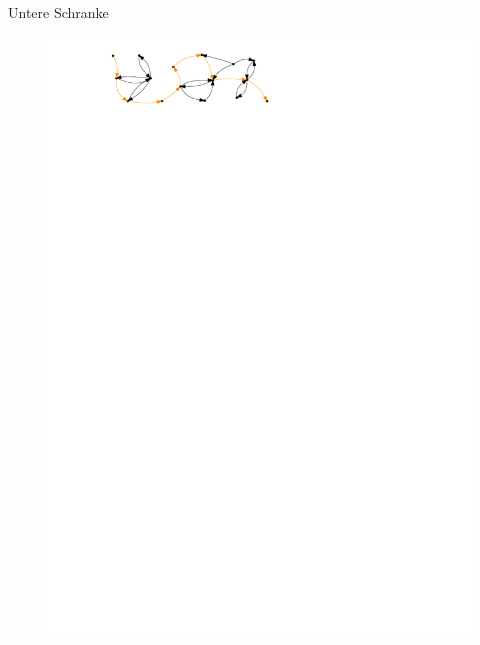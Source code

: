 \documentclass[18pt]{beamer}
\begin{document}
\begin{frame}{Untere Schranke}
{\begin{figure}
	\includegraphics[page=4]{pdf/longestpath.pdf}
	\end{figure}
	}
\end{frame}
\end{document}
